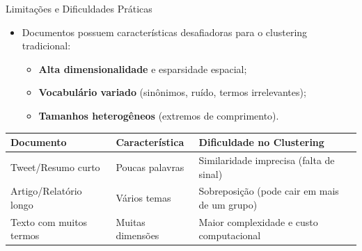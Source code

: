 \documentclass[aspectratio=43]{beamer}
\begin{document}
\begin{frame}[t]{Limitações e Dificuldades Práticas}

\vspace{0.1cm}

\begin{itemize}
    \item Documentos possuem características desafiadoras para o clustering tradicional:
    \begin{itemize}
        \item \textbf{Alta dimensionalidade} e esparsidade espacial;
        \item \textbf{Vocabulário variado} (sinônimos, ruído, termos irrelevantes);
        \item \textbf{Tamanhos heterogêneos} (extremos de comprimento).
    \end{itemize}
\end{itemize}

\vspace{0.15cm}

\begin{center}
\scriptsize
\renewcommand{\arraystretch}{1.3}
\begin{tabular}{P{2.6cm} P{2.7cm} P{3.5cm}}
\hline
\textbf{Documento} & \textbf{Característica} & \textbf{Dificuldade no Clustering} \\
\hline
Tweet/Resumo curto & Poucas palavras & Similaridade imprecisa (falta de sinal) \\
Artigo/Relatório longo & Vários temas & Sobreposição (pode cair em mais de um grupo) \\
Texto com muitos termos & Muitas dimensões & Maior complexidade e custo computacional \\
\hline
\end{tabular}
\end{center}

\end{frame}
\end{document}
